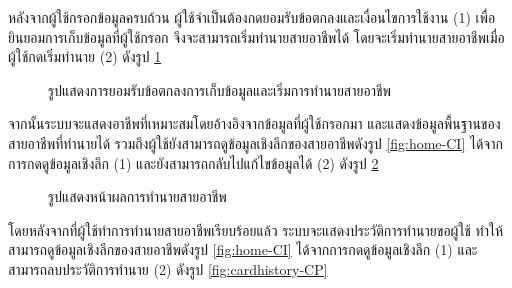 หลังจากผู้ใช้กรอกข้อมูลครบถ้วน ผู้ใช้จำเป็นต้องกดยอมรับข้อตกลงและเงื่อนไขการใช้งาน (1) เพื่อยินยอมการเก็บข้อมูลที่ผู้ใช้กรอก จึงจะสามารถเริ่มทำนายสายอาชีพได้ โดยจะเริ่มทำนายสายอาชีพเมื่อผู้ใช้กดเริ่มทำนาย (2) ดังรูป \ref{fig:accept-CP}
\begin{figure}[H]\centering
    \caption{รูปแสดงการยอมรับข้อตกลงการเก็บข้อมูลและเริ่มการทำนายสายอาชีพ}\label{fig:accept-CP}
\end{figure}
จากนั้นระบบจะแสดงอาชีพที่เหมาะสมโดยอ้างอิงจากข้อมูลที่ผู้ใช้กรอกมา และแสดงข้อมูลพื้นฐานของสายอาชีพที่ทำนายได้ รวมถึงผู้ใช้ยังสามารถดูข้อมูลเชิงลึกของสายอาชีพดังรูป \ref{fig:home-CI} ได้จากการกดดูข้อมูลเชิงลึก (1) และยังสามารถกลับไปแก้ไขข้อมูลได้ (2) ดังรูป \ref{fig:viewmore-CP} 
\begin{figure}[H]\centering
    \caption{รูปแสดงหน้าผลการทำนายสายอาชีพ}\label{fig:viewmore-CP}
\end{figure}
โดยหลังจากที่ผู้ใช้ทำการทำนายสายอาชีพเรียบร้อยแล้ว ระบบจะแสดงประวัติการทำนายขอผู้ใช้ ทำให้สามารถดูข้อมูลเชิงลึกของสายอาชีพดังรูป \ref{fig:home-CI} ได้จากการกดดูข้อมูลเชิงลึก (1) และสามารถลบประวัติการทำนาย (2) ดังรูป \ref{fig:cardhistory-CP} 
